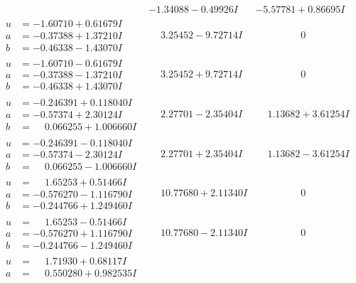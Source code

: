 \documentclass[1p]{elsarticle_modified}
\theoremstyle{definition}
\begin{document}
$$\begin{array}{c|c|c}
 & -1.34088 - 0.49926 I & -5.57781 + 0.86695 I \\ \hline\begin{aligned}
u &= -1.60710 + 0.61679 I \\
a &= -0.37388 + 1.37210 I \\
b &= -0.46338 - 1.43070 I\end{aligned}
 & \phantom{-}3.25452 - 9.72714 I & \phantom{-0.000000 } 0 \\ \hline\begin{aligned}
u &= -1.60710 - 0.61679 I \\
a &= -0.37388 - 1.37210 I \\
b &= -0.46338 + 1.43070 I\end{aligned}
 & \phantom{-}3.25452 + 9.72714 I & \phantom{-0.000000 } 0 \\ \hline\begin{aligned}
u &= -0.246391 + 0.118040 I \\
a &= -0.57374 + 2.30124 I \\
b &= \phantom{-}0.066255 + 1.006660 I\end{aligned}
 & \phantom{-}2.27701 - 2.35404 I & \phantom{-}1.13682 + 3.61254 I \\ \hline\begin{aligned}
u &= -0.246391 - 0.118040 I \\
a &= -0.57374 - 2.30124 I \\
b &= \phantom{-}0.066255 - 1.006660 I\end{aligned}
 & \phantom{-}2.27701 + 2.35404 I & \phantom{-}1.13682 - 3.61254 I \\ \hline\begin{aligned}
u &= \phantom{-}1.65253 + 0.51466 I \\
a &= -0.576270 - 1.116790 I \\
b &= -0.244766 + 1.249460 I\end{aligned}
 & \phantom{-}10.77680 + 2.11340 I & \phantom{-0.000000 } 0 \\ \hline\begin{aligned}
u &= \phantom{-}1.65253 - 0.51466 I \\
a &= -0.576270 + 1.116790 I \\
b &= -0.244766 - 1.249460 I\end{aligned}
 & \phantom{-}10.77680 - 2.11340 I & \phantom{-0.000000 } 0 \\ \hline\begin{aligned}
u &= \phantom{-}1.71930 + 0.68117 I \\
a &= \phantom{-}0.550280 + 0.982535 I \\

\end{aligned}
\end{array}$$
\end{document}
